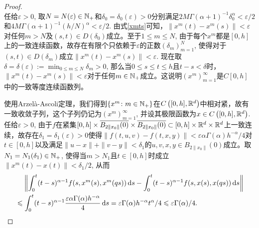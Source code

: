 \begin{proof}
\begin{equation}
    \end{equation}
    任给$\varepsilon>0$, 取$N=N(\varepsilon)\in \mathbb{N_+}$和$\delta_0=\delta_0(\varepsilon)>0$分别满足$2M\Gamma(\alpha+1)^{-1}\delta_0^\alpha < \varepsilon/2$和$4M\Gamma(\alpha+1)^{-1}(h/N)^\alpha<\varepsilon/2$. 由式\eqref{xmts}可知，$\left\| x^m(t)-x^m(s) \right\| < \varepsilon$对任何$m>N$及$(s,t)\in D(\delta_0)$成立。至于$1\leqslant m\leqslant N$, 由于每个$x^m$都是$[0,h]$上的一致连续函数，故存在有限个只依赖于$\varepsilon$的正数$\left(\delta_m\right)_{m=1}^N$, 使得对于$(s,t)\in D(\delta_m)$成立$\left\| x^m(t)-x^m(s) \right\| < \varepsilon$. 现在取$\delta=\delta(\varepsilon):=\min_{0\leqslant m\leqslant N} \delta_m>0$, 那么当$0\leqslant s\leqslant t \leqslant h$且$t-s<\delta$时，$\left\| x^m(t)-x^m(s) \right\| < \varepsilon$对于任何$m\in \mathbb{N_+}$成立。这说明$\left(x^m\right)_{m=1}^\infty$是$C[0,h]$中的一致等度连续函数列。

    使用Arzel\`a-Ascoli定理，我们得到$\left\{x^m\colon m\in \mathbb{N_+}\right\}$在$C\left([0,h],\mathbb{R}^d\right)$中相对紧，故有一致收敛子列，这个子列仍记为$\left(x^m\right)_{m=1}^\infty$, 并设其极限函数为$x\in C\left([0,h],\mathbb{R}^d\right)$. 任给$\varepsilon>0$, 由于$f$在紧集$[0,h]\times \overline{B_{2\|x_0\|}(0)}\times \overline{B_{2\|x_0\|}(0)}\subset [0,h]\times \mathbb{R}^d\times \mathbb{R}^d$上一致连续，故存在$\delta_1=\delta_1(\varepsilon)>0$使得$\|f(t,u,v)-f(t,x,y)\|<\varepsilon \alpha \Gamma(\alpha) h^{-\alpha} / 4$对$t\in [0,h]$以及满足$\|u-x\|+\|v-y\|<\delta_1$的$u,v,x,y\in B_{2\|x_0\|}(0)$成立。取$N_1=N_1(\delta_1)\in \mathbb{N_+}$, 使得当$m>N_1$且$t\in [0,h]$时成立$\left\|x^m(t)-x(t)\right\|<\delta_1/2$, 从而
    \begin{equation}\label{xmx}
        \begin{aligned}
            &\relphantom{\leqslant}\left\|\int_{0}^{t}(t-s)^{\alpha-1}f(s,x^m(s),x^m(qs))\differential s - \int_{0}^{t}(t-s)^{\alpha-1}f(s,x(s),x(qs))\differential s\right\|
            \\ &\leqslant \int_{0}^{t}(t-s)^{\alpha-1} \frac{\varepsilon \alpha \Gamma(\alpha) h^{-\alpha}}{4} \differential s=\varepsilon \Gamma(\alpha) h^{-\alpha} t^\alpha / 4 \leqslant \varepsilon\Gamma(\alpha)/4.
        \end{aligned}
    \end{equation}


\end{proof}
